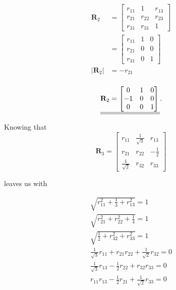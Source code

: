 \documentclass{article}
\begin{document}
\begin{align*}
\mathbf{R}_2 &= 
    \begin{bmatrix}
    r_{11} & 1 & r_{13} \\
    r_{21} & r_{22} & r_{23} \\
    r_{31} & r_{31} & 1
    \end{bmatrix}\\
            &= 
    \begin{bmatrix}
    r_{11} & 1 & 0 \\
    r_{21} & 0 & 0 \\
    r_{31} & 0 & 1
    \end{bmatrix}\\
|\mathbf{R}_2| &= -r_{21}\\
\end{align*}

\begin{equation*}
    \underline{\underline{\mathbf{R}_2 = \begin{bmatrix}
    0 & 1 & 0 \\
    -1 & 0 & 0 \\
    0 & 0 & 1
    \end{bmatrix}\\}}.
\end{equation*}

Knowing that 
\begin{equation*}
\mathbf{R}_3 = 
    \begin{bmatrix}
    r_{11} & \frac{1}{\sqrt{3}} & r_{13} \\
    r_{21} & r_{22} & -\frac{1}{2} \\
    \frac{1}{\sqrt{2}} & r_{32} & r_{33}
    \end{bmatrix}
\end{equation*}

leaves us with 

\begin{align*}
    \sqrt{r_{11}^2 + \frac{1}{3} + r_{13}^2} = 1\\
    \sqrt{r_{21}^2 + r_{22}^2 + \frac{1}{4}} = 1\\
    \sqrt{\frac{1}{2} + r_{32}^2 + r_{33}^2} = 1\\
    \frac{1}{\sqrt{3}}r_{11} + r_{21}r_{22} + \frac{1}{\sqrt{2}}r_{32} = 0\\
    \frac{1}{\sqrt{3}}r_{13} -\frac{1}{2}r_{22} + r_{32}r_{33} = 0\\
    r_{11}r_{13} -\frac{1}{2}r_{21} + \frac{1}{\sqrt{2}}r_{33} = 0
\end{align*}
\end{document}
